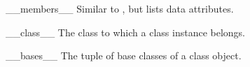 \begin{memberdescni}{__members__}
Similar to , but lists data attributes.
\end{memberdescni}

\begin{memberdescni}{__class__}
The class to which a class instance belongs.
\end{memberdescni}

\begin{memberdescni}{__bases__}
The tuple of base classes of a class object.
\end{memberdescni}
